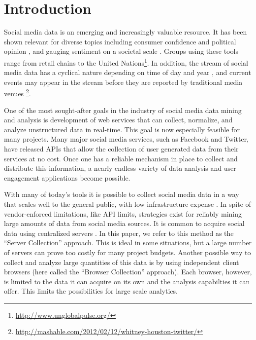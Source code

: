 \documentclass[letterpaper]{article}
\begin{document}
\section{Introduction}

Social media data is an emerging and increasingly valuable resource.  It has been shown relevant for diverse topics including consumer confidence and political opinion \cite{tweetspolls,germantwitter}, and gauging sentiment on a societal scale \cite{10.1371/journal.pone.0026752}.    Groups using these tools range from retail chains \cite{target} to the United Nations\footnote{\url{http://www.unglobalpulse.org/}}. In addition, the stream of social media data has a cyclical nature depending on time of day and year \cite{facebookrhythms}, and current events may appear in the stream before they are reported by traditional media venues \footnote{\url{http://mashable.com/2012/02/12/whitney-houston-twitter/}}.

One of the most sought-after goals in the industry of social media data mining and analysis is development of web services that can collect, normalize, and analyze unstructured data in real-time. This goal is now especially feasible for many projects. Many major social media services, such as Facebook and Twitter, have released APIs that allow the collection of user generated data from their services at no cost. Once one has a reliable mechanism in place to collect and distribute this information, a nearly endless variety of data analysis and user engagement applications become possible.

With many of today's tools it is possible to collect social media data in a way that scales well to the general public, with low infrastructure expense \cite{miningsocialweb}. In spite of vendor-enforced limitations, like API limits, strategies exist for reliably mining large amounts of data from social media sources. It is common to acquire social data using centralized servers \cite{5992588}. In this paper, we refer to this method as the ``Server Collection'' approach. This is ideal in some situations, but a large number of servers can prove too costly for many project budgets. Another possible way to collect and analyze large quantities of this data is by using independent client browsers (here called the ``Browser Collection'' approach). Each browser, however, is limited to the data it can acquire on its own and the analysis capabilties it can offer. This limits the possibilities for large scale analytics.
\end{document}

